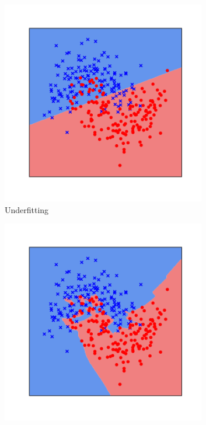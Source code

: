 \begin{figure}[t]
  \centering
  \begin{subfigure}[b]{0.32\textwidth}
    \includegraphics[width=0.98\textwidth]{figures/main/ch2-background/underfitting.pdf}
    \caption{Underfitting}
    \label{figure:ch2-fitting_points_a}
  \end{subfigure}
  \hfill
  \begin{subfigure}[b]{0.32\textwidth}
    \includegraphics[width=0.98\textwidth]{figures/main/ch2-background/overfitting.pdf}

\end{subfigure}
\end{figure}
